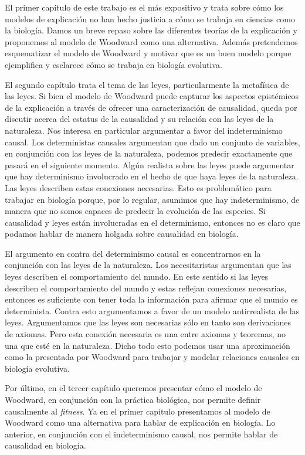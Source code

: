 El primer capítulo de este trabajo es el más expositivo y trata sobre cómo los modelos de explicación no han hecho justicia a cómo se trabaja en ciencias como la biología. Damos un breve repaso sobre las diferentes teorías de la explicación y proponemos al modelo de Woodward como una alternativa. Además pretendemos esquematizar el modelo de Woodward y motivar que es un buen modelo porque ejemplifica y esclarece cómo se trabaja en biología evolutiva.

El segundo capítulo trata el tema de las leyes, particularmente la metafísica de las leyes. Si bien el modelo de Woodward puede capturar los aspectos epistémicos de la explicación a través de ofrecer una caracterización de causalidad, queda por discutir acerca del estatus de la causalidad y su relación con las leyes de la naturaleza. Nos interesa en particular argumentar a favor del indeterminismo causal. Los deterministas causales argumentan que dado un conjunto de variables, en conjunción con las leyes de la naturaleza, podemos predecir exactamente que pasará en el siguiente momento. Algún realista sobre las leyes puede argumentar que hay determinismo involucrado en el hecho de que haya leyes de la naturaleza. Las leyes describen estas conexiones necesarias. Esto es problemático para trabajar en biología porque, por lo regular, asumimos que hay indeterminismo, de manera que no somos capaces de predecir la evolución de las especies. Si causalidad y leyes están involucradas en el determinismo, entonces no es claro que podamos hablar de manera holgada sobre causalidad en biología.

El argumento en contra del determinismo causal es concentrarnos en la conjunción con las leyes de la naturaleza. Los necesitaristas argumentan que las leyes describen el comportamiento del mundo. En este sentido si las leyes describen el comportamiento del mundo y estas reflejan conexiones necesarias, entonces es suficiente con tener toda la información para afirmar que el mundo es determinista. Contra esto argumentamos a favor de un modelo antirrealista de las leyes. Argumentamos que las leyes son necesarias sólo en tanto son derivaciones de axiomas. Pero esta conexión necesaria es una entre axiomas y teoremas, no una que esté en la naturaleza. Dicho todo esto podemos usar una aproximación como la presentada por Woodward para trabajar y modelar relaciones causales en biología evolutiva.

Por último, en el tercer capítulo queremos presentar cómo el modelo de Woodward, en conjunción con la práctica biológica, nos permite definir causalmente al \emph{fitness}. Ya en el primer capítulo presentamos al modelo de Woodward como una alternativa para hablar de explicación en biología. Lo anterior, en conjunción con el indeterminismo causal, nos permite hablar de causalidad en biología.


